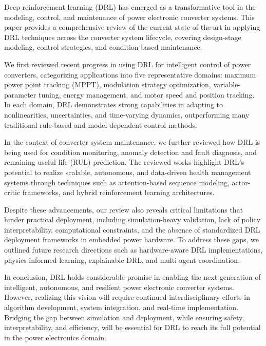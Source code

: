 Deep reinforcement learning (DRL) has emerged as a transformative tool in the modeling, control, and maintenance of power electronic converter systems. This paper provides a comprehensive review of the current state-of-the-art in applying DRL techniques across the converter system lifecycle, covering design-stage modeling, control strategies, and condition-based maintenance.

We first reviewed recent progress in using DRL for intelligent control of power converters, categorizing applications into five representative domains: maximum power point tracking (MPPT), modulation strategy optimization, variable-parameter tuning, energy management, and motor speed and position tracking. In each domain, DRL demonstrates strong capabilities in adapting to nonlinearities, uncertainties, and time-varying dynamics, outperforming many traditional rule-based and model-dependent control methods.

In the context of converter system maintenance, we further reviewed how DRL is being used for condition monitoring, anomaly detection and fault diagnosis, and remaining useful life (RUL) prediction. The reviewed works highlight DRL’s potential to realize scalable, autonomous, and data-driven health management systems through techniques such as attention-based sequence modeling, actor-critic frameworks, and hybrid reinforcement learning architectures.

Despite these advancements, our review also reveals critical limitations that hinder practical deployment, including simulation-heavy validation, lack of policy interpretability, computational constraints, and the absence of standardized DRL deployment frameworks in embedded power hardware. To address these gaps, we outlined future research directions such as hardware-aware DRL implementations, physics-informed learning, explainable DRL, and multi-agent coordination.

In conclusion, DRL holds considerable promise in enabling the next generation of intelligent, autonomous, and resilient power electronic converter systems. However, realizing this vision will require continued interdisciplinary efforts in algorithm development, system integration, and real-time implementation. Bridging the gap between simulation and deployment, while ensuring safety, interpretability, and efficiency, will be essential for DRL to reach its full potential in the power electronics domain.
